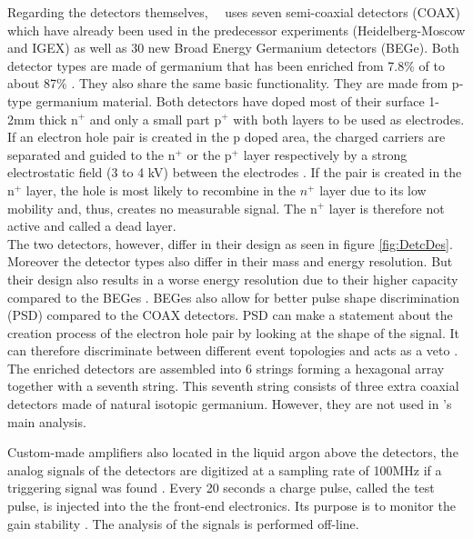 \documentclass[encoding=utf8,british]{tumphthesis}
\begin{document}
Regarding the detectors themselves, \gerda\ \PII\ uses seven semi-coaxial detectors (COAX) which have already been used in the predecessor experiments (Heidelberg-Moscow and IGEX) as well as 30 new Broad Energy Germanium detectors (BEGe).
Both detector types are made of germanium that has been enriched from 7.8$\%$ of  to about 87$\%$ \cite{agostini_background_2017}.
They also share the same basic functionality.
They are made from p-type germanium material.
Both detectors have doped most of their surface 1-2mm thick n$^+$ and only a small part p$^+$ with both layers to be used as electrodes.
If an electron hole pair is created in the p doped area, the charged carriers are separated and guided to the n$^+$ or the p$^+$ layer respectively by a strong electrostatic field (3 to 4 kV) between the electrodes  \cite{spieler_semiconductor_2005}.
If the pair is created in the n$^+$ layer, the hole is most likely to recombine in the $n^+$ layer due to its low mobility and, thus, creates no measurable signal.
The n$^+$ layer is therefore not active and called a dead layer.
\\

The two detectors, however, differ in their design as seen in figure \ref{fig:DetcDes}.
Moreover the detector types also differ in their mass and energy resolution.
But their design also results in a worse energy resolution due to their higher capacity compared to the BEGes \cite{agostini_production_2015}.
BEGes also allow for better pulse shape discrimination (PSD) compared to the COAX detectors.
PSD can make a statement about the creation process of the electron hole pair by looking at the shape of the signal.
It can therefore discriminate between different event topologies and acts as a veto \cite{agostini_pulse_2013}.
\\

The enriched detectors are assembled into 6 strings forming a hexagonal array together with a seventh string.
This seventh string consists of three extra coaxial detectors made of natural isotopic germanium.
However, they are not used in \gerda's main analysis.

Custom-made amplifiers also located in the liquid argon above the detectors, the analog signals of the detectors are digitized at a sampling rate of 100MHz if a triggering signal was found \cite{riboldi_cryogenic_2015}.
Every 20 seconds a charge pulse, called the test pulse, is injected into the the front-end electronics.
Its purpose is to monitor the gain stability \cite{agostini_background_2017}.
The analysis of the signals is performed off-line.
\end{document}
